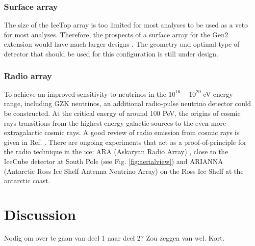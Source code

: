 \subsubsection{Surface array}
The size of the IceTop array is too limited for most analyses to be used as a veto for most analyses. Therefore, the prospects of a surface array for the Gen2 extension would have much larger designs \cite{Euler:2015oen}. The geometry and optimal type of detector that should be used for this configuration is still under design.
\subsubsection{Radio array}
\label{subsub:radio}
To achieve an improved sensitivity to neutrinos in the $10^{16} - 10^{20}$ eV energy range, including GZK neutrinos, an additional radio-pulse neutrino detector could be constructed. At the critical energy of around 100 PeV, the origins of cosmic rays transitions from the highest-energy galactic sources to the even more extragalactic cosmic rays. A good review of radio emission from cosmic rays is given in Ref. \cite{Schroder:2016hrv}. There are ongoing experiments that act as a proof-of-principle for the radio technique in the ice: ARA (Askaryan Radio Array) \cite{Allison:2015eky}, close to the IceCube detector at South Pole (see Fig. \ref{fig:aerialview}) and ARIANNA (Antarctic Ross Ice Shelf Antenna Neutrino Array) \cite{Glaser:2018ifj} on the Ross Ice Shelf at the antarctic coast.






\section{Discussion}
Nodig om over te gaan van deel 1 naar deel 2? Zou zeggen van wel. Kort.





